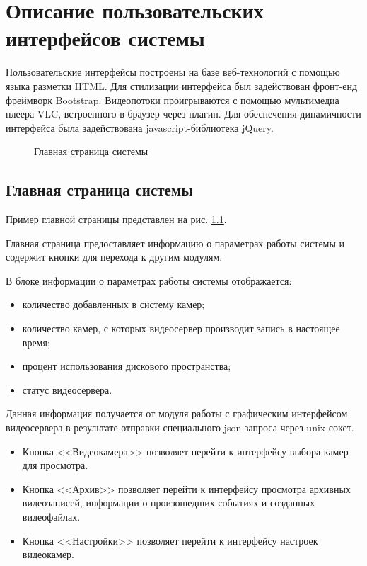 \chapter{Описание пользовательских интерфейсов системы}
Пользовательские интерфейсы построены на базе веб-технологий с помощью языка разметки HTML.
Для стилизации интерфейса был задействован фронт-енд фреймворк Bootstrap.
Видеопотоки проигрываются с помощью мультимедиа плеера VLC, встроенного в браузер через плагин.
Для обеспечения динамичности интерфейса была задействована javascript-библиотека jQuery.

\begin{figure}[!htb]
\def\svgwidth{\columnwidth}
\caption{Главная страница системы}
\label{ui_1}
\end{figure}

\section{Главная страница системы}
Пример главной страницы представлен на рис. \ref{ui_1}.

Главная страница предоставляет информацию о параметрах работы системы и содержит
кнопки для перехода к другим модулям.

В блоке информации о параметрах работы системы отображается:
\smallskip
\begin{itemize}
\item количество добавленных в систему камер;
\item количество камер, с которых видеосервер производит запись в настоящее время;
\item процент использования дискового пространства;
\item статус видеосервера.
\end{itemize}

Данная информация получается от модуля работы с графическим интерфейсом видеосервера
в результате отправки специального json запроса через unix-сокет.

\begin{itemize}
\item Кнопка <<Видеокамера>> позволяет перейти к интерфейсу выбора камер для просмотра.
\item Кнопка <<Архив>> позволяет перейти к интерфейсу просмотра архивных видеозаписей, информации
о произошедших событиях и созданных видеофайлах.
\item Кнопка <<Настройки>> позволяет перейти к интерфейсу настроек видеокамер.
\end{itemize}

